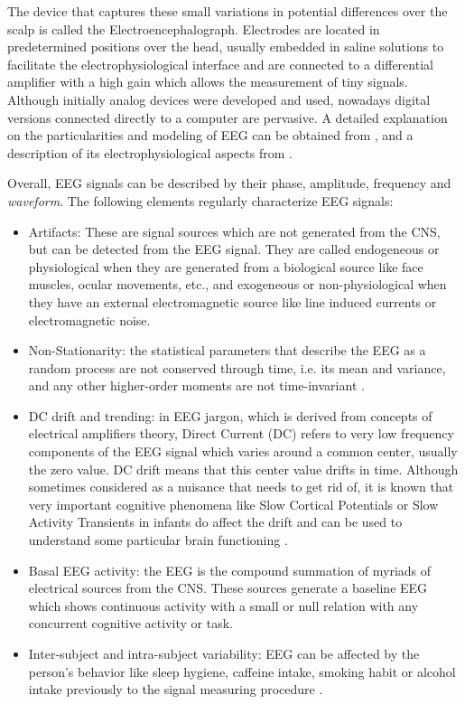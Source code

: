 \documentclass[brainsci,article,submit,moreauthors,pdftex,10pt,a4paper]{mdpi}
\begin{document}

The device that captures these small variations in potential differences over the scalp is called the Electroencephalograph.  Electrodes are located in predetermined positions over the head, usually embedded in saline solutions to facilitate the electrophysiological interface and are connected to a differential amplifier with a high gain which allows the measurement of tiny signals. Although initially analog devices were developed and used, nowadays digital versions connected directly to a computer are pervasive.  A detailed explanation on the particularities and modeling of EEG can be obtained from \citep{Jackson2014}, and a description of its electrophysiological aspects from \citep{Haberman2012}.

Overall, EEG signals can be described by their phase, amplitude,  frequency and \textit{waveform}.  The following elements regularly  characterize EEG signals:

\begin{itemize}
\item Artifacts:  These are signal sources which are not generated from the CNS, but can be detected from the EEG signal.  They are called endogeneous or physiological when they are generated from a biological source like face muscles, ocular movements, etc., and exogeneous or non-physiological when they have an external electromagnetic source like line induced currents or electromagnetic noise\citep{Weeda2012}.
\item Non-Stationarity: the statistical parameters that describe the EEG as a random process are not conserved through time, i.e. its mean and variance, and any other higher-order moments are not time-invariant \citep{Jansen1991}.
\item DC drift and trending: in EEG jargon, which is derived from concepts of electrical amplifiers theory, Direct Current (DC) refers to very low frequency components of the EEG signal which varies around a common center, usually the zero value.  DC drift means that this center value drifts in time.  Although sometimes considered as a nuisance that needs to get rid of, it is known that very important cognitive phenomena like Slow Cortical Potentials or Slow Activity Transients in infants do affect the drift and can be used to understand some particular brain functioning \cite{Schomer2010}.
\item Basal EEG activity: the EEG is the compound summation of myriads of electrical sources from the CNS.  These sources generate a baseline EEG which shows continuous activity with a small or null relation with any concurrent cognitive activity or task.
\item Inter-subject and intra-subject variability: EEG can be affected by the person's behavior like sleep hygiene, caffeine intake, smoking habit or alcohol intake previously to the signal measuring procedure \citep{Farzan2017}.
\end{itemize}
\end{document}
